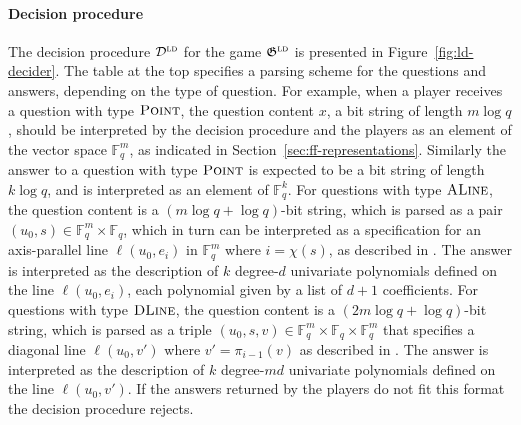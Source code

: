 \documentclass[11pt]{article}
\theoremstyle{definition}
\newcommand{\F}{\ensuremath{\mathbb{F}}}
\newcommand{\ld}{\textsc{ld}}
\newcommand{\game}{\mathfrak{G}}
\newcommand{\decider}{\mathcal{D}}
\newcommand{\typestyle}[1]{\ensuremath{\textsc{#1}}\xspace}
\renewcommand{\line}{\mathbf{\ell}}
\newcommand{\Point}{\typestyle{Point}}
\newcommand{\ALine}{\typestyle{ALine}}
\newcommand{\DLine}{\typestyle{DLine}}
\newcommand{\ldc}{k}
\begin{document}
\paragraph{Decision procedure} The decision procedure $\decider^\ld$ for the
game $\game^\ld$ is presented in Figure~\ref{fig:ld-decider}.
The table at the top specifies a parsing scheme for the questions and answers,
depending on the type of question.
For example, when a player receives a question with type $\Point$, the question
content $x$, a bit string of length $m \log q$, should be interpreted by the
decision procedure and the players as an element of the vector space $\F_q^m$,
as indicated in Section~\ref{sec:ff-representations}.
Similarly the answer to a question with type $\Point$ is expected to be a bit
string of length $\ldc \log q$, and is interpreted as an element of $\F_q^\ldc$.
For questions with type $\ALine$, the question content is a $(m \log q + \log
q)$-bit string, which is parsed as a pair $(u_0, s) \in \F_q^m \times \F_q$,
which in turn can be interpreted as a specification for an axis-parallel line
$\line(u_0,e_i)$ in $\F_q^m$ where $i = \chi(s)$, as described in
.
The answer is interpreted as the description of $\ldc$ degree-$d$ univariate
polynomials defined on the line $\line(u_0,e_i)$, each polynomial given by a
list of $d+1$ coefficients.
For questions with type $\DLine$, the question content is a $(2m \log q + \log
q)$-bit string, which is parsed as a triple $(u_0, s, v) \in \F_q^m \times \F_q
\times \F_q^m$ that specifies a diagonal line $\line(u_0,v')$ where $v' =
\pi_{i-1}(v)$ as described in .
The answer is interpreted as the description of $\ldc$ degree-$md$ univariate
polynomials defined on the line $\line(u_0,v')$.
If the answers returned by the players do not fit this format the decision
procedure rejects.
\end{document}
